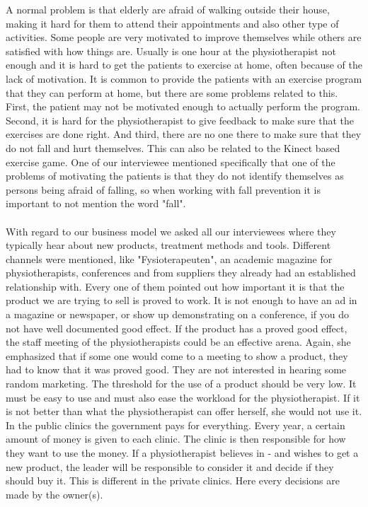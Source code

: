 A normal problem is that elderly are afraid of walking outside their house, making it hard for them to attend their appointments and also other type of activities. Some people are very motivated to improve themselves while others are satisfied with how things are. Usually is one hour at the physiotherapist not enough and it is hard to get the patients to exercise at home, often because of the lack of motivation. It is common to provide the patients with an exercise program that they can perform at home, but there are some problems related to this. First, the patient may not be motivated enough to actually perform the program. Second, it is hard for the physiotherapist to give feedback to make sure that the exercises are done right. And third, there are no one there to make sure that they do not fall and hurt themselves. This can also be related to the Kinect based exercise game. One of our interviewee mentioned specifically that one of the problems of motivating the patients is that they do not identify themselves as  persons being afraid of falling, so when working with fall prevention it is important to not mention the word "fall". \\ \\
With regard to our business model we asked all our interviewees where they typically hear about new products, treatment methods and tools. Different channels were mentioned, like "Fysioterapeuten", an academic magazine for physiotherapists, conferences and from suppliers they already had an established relationship with. Every one of them pointed out how important it is that the product we are trying to sell is proved to work. It is not enough to have an ad in a magazine or newspaper, or show up demonstrating on a conference, if you do not have well documented good effect. If the product has a proved good effect, the staff meeting of the physiotherapists could be an effective arena. Again, she emphasized that if some one would come to a meeting to show a product, they had to know that it was proved good. They are not interested in hearing some random marketing. The threshold for the use of a product should be very low. It must be easy to use and must also ease the workload for the physiotherapist. If it is not better than what the physiotherapist can offer herself, she would not use it. In the public clinics the government pays for everything. Every year, a certain amount of money is given to each clinic. The clinic is then responsible for how they want to use the money. If a physiotherapist believes in - and wishes to get a new product, the leader will be responsible to consider it and decide if they should buy it. This is different in the private clinics. Here every decisions are made by the owner(s). \\ \\
